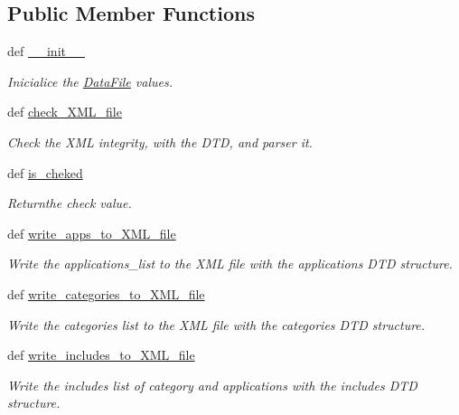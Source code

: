 \subsection*{Public Member Functions}
\begin{CompactItemize}
\item 
def \hyperlink{classwinsollib_1_1DataFile_22c2b3c07b3991b6c2300719eccd9687}{\_\-\_\-init\_\-\_\-}
\begin{CompactList}\small\item\em Inicialice the \hyperlink{classwinsollib_1_1DataFile}{Data\-File} values. \item\end{CompactList}\item 
def \hyperlink{classwinsollib_1_1DataFile_9526df0d51f57fade5dbe0b541fc5da4}{check\_\-XML\_\-file}
\begin{CompactList}\small\item\em Check the XML integrity, with the DTD, and parser it. \item\end{CompactList}\item 
def \hyperlink{classwinsollib_1_1DataFile_71feb0933f381bb2dc77115bbd3114ca}{is\_\-cheked}
\begin{CompactList}\small\item\em Returnthe check value. \item\end{CompactList}\item 
def \hyperlink{classwinsollib_1_1DataFile_ec7a45f4fc3069f7da870bc41e27963f}{write\_\-apps\_\-to\_\-XML\_\-file}
\begin{CompactList}\small\item\em Write the applications\_\-list to the XML file with the applications DTD structure. \item\end{CompactList}\item 
def \hyperlink{classwinsollib_1_1DataFile_43018e66b71925ff9050c17e733b7308}{write\_\-categories\_\-to\_\-XML\_\-file}
\begin{CompactList}\small\item\em Write the categories list to the XML file with the categories DTD structure. \item\end{CompactList}\item 
def \hyperlink{classwinsollib_1_1DataFile_76c4b5fd1fac580996b094f31c6f5f7a}{write\_\-includes\_\-to\_\-XML\_\-file}
\begin{CompactList}\small\item\em Write the includes list of category and applications with the includes DTD structure. \item\end{CompactList}\item 

\end{CompactItemize}
